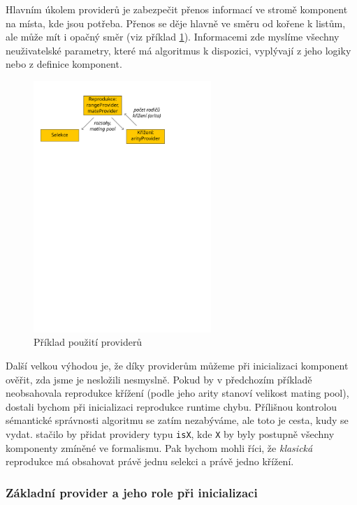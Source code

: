 Hlavním úkolem providerů je zabezpečit přenos informací ve stromě komponent na místa, kde jsou potřeba. Přenos se děje hlavně ve směru od kořene k listům, ale může mít i opačný směr (viz příklad \ref{providersEx}). Informacemi zde myslíme všechny neuživatelské parametry, které má algoritmus k dispozici, vyplývají z jeho logiky nebo z definice komponent.

\begin{figure}[h!]
\begin{center}
  \includegraphics[width=0.6\textwidth]{img/providersEx}
  \caption{Příklad použití providerů}\label{providersEx}
  \end{center}
\end{figure}

Další velkou výhodou je, že díky providerům můžeme při inicializaci komponent ověřit, zda jsme je nesložili nesmyslně. Pokud by v předchozím příkladě neobsahovala reprodukce křížení (podle jeho arity stanoví velikost mating pool), dostali bychom při inicializaci reprodukce runtime chybu. Přílišnou kontrolou sémantické správnosti algoritmu se zatím nezabýváme, ale toto je cesta, kudy se vydat. stačilo by přidat providery typu \texttt{isX}, kde \texttt{X} by byly postupně všechny komponenty zmíněné ve formalismu. Pak bychom mohli říci, že \emph{klasická} reprodukce má obsahovat právě jednu selekci a právě jedno křížení.

\subsubsection{Základní provider a jeho role při inicializaci}

